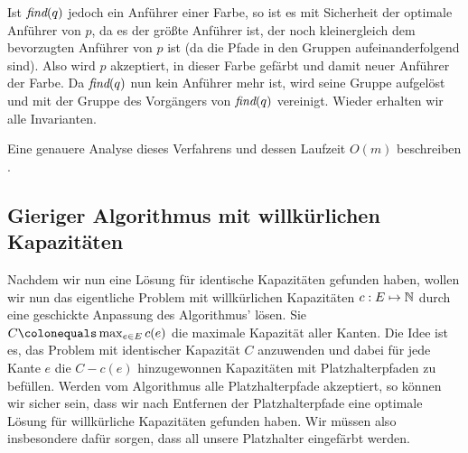 Ist $\text{\em find}(q)$ jedoch ein Anführer einer Farbe, so ist es mit Sicherheit der optimale Anführer von $p$, da es der größte
Anführer ist, der noch kleinergleich dem bevorzugten Anführer von $p$ ist (da die Pfade in den Gruppen
aufeinanderfolgend sind).
Also wird $p$ akzeptiert, in dieser Farbe gefärbt und damit neuer Anführer der Farbe.
Da $\text{\em find}(q)$ nun kein Anführer mehr ist, wird seine Gruppe aufgelöst und mit der Gruppe des Vorgängers von $\text{\em find}(q)$
vereinigt.
Wieder erhalten wir alle Invarianten.

Eine genauere Analyse dieses Verfahrens und dessen Laufzeit $O(m)$ beschreiben .

\subsection{Gieriger Algorithmus mit willkürlichen Kapazitäten}\label{subsec:anpassenAnWillkürlicheKapazitäten}

Nachdem wir nun eine Lösung für identische Kapazitäten gefunden haben, wollen wir nun das eigentliche Problem mit
willkürlichen Kapazitäten $c: E \mapsto \mathbb N$ durch eine geschickte Anpassung des Algorithmus' lösen.
Sie $C \colonequals \max_{e \in E} c(e)$ die maximale Kapazität aller Kanten.
Die Idee ist es, das Problem mit identischer Kapazität $C$ anzuwenden und dabei für jede Kante $e$ die $C - c(e)$
hinzugewonnen Kapazitäten mit Platzhalterpfaden zu befüllen.
Werden vom Algorithmus alle Platzhalterpfade akzeptiert, so können wir sicher sein, dass wir nach Entfernen der
Platzhalterpfade eine optimale Lösung für willkürliche Kapazitäten gefunden haben.
Wir müssen also insbesondere dafür sorgen, dass all unsere Platzhalter eingefärbt werden.























